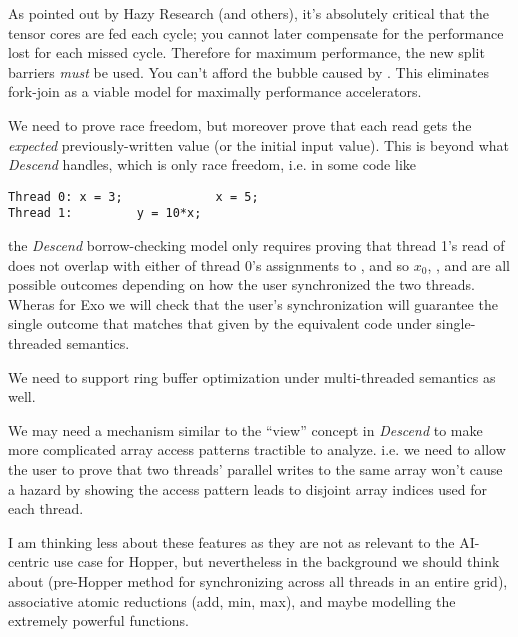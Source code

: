 \filbreak
{} As pointed out by Hazy Research (and others), it's absolutely critical that the tensor cores are fed each cycle; you cannot later compensate for the performance lost for each missed cycle. Therefore for maximum performance, the new split barriers \textit{must} be used. You can't afford the bubble caused by . This eliminates fork-join as a viable model for maximally performance accelerators.

\filbreak
{} We need to prove race freedom, but moreover prove that each read gets the \textit{expected} previously-written value (or the initial input value). This is beyond what \textit{Descend} handles, which is only race freedom, i.e. in some code like

{\color{lightttColor}
\begin{verbatim}
Thread 0: x = 3;             x = 5;
Thread 1:         y = 10*x;
\end{verbatim}
}

the \textit{Descend} borrow-checking model only requires proving that thread 1's read of  does not overlap with either of thread 0's assignments to , and so $x_0$, , and  are all possible outcomes depending on how the user synchronized the two threads. Wheras for Exo we will check that the user's synchronization will guarantee the single outcome that matches that given by the equivalent code under single-threaded semantics.

\filbreak
{} We need to support ring buffer optimization under multi-threaded semantics as well.

\filbreak
{} We may need a mechanism similar to the ``view'' concept in \textit{Descend} to make more complicated array access patterns tractible to analyze. i.e. we need to allow the user to prove that two threads' parallel writes to the same array won't cause a hazard by showing the access pattern leads to disjoint array indices used for each thread.

\filbreak
{} I am thinking less about these features as they are not as relevant to the AI-centric use case for Hopper, but nevertheless in the background we should think about  (pre-Hopper method for synchronizing across all threads in an entire grid), associative atomic reductions (add, min, max), and maybe modelling the extremely powerful  functions.

